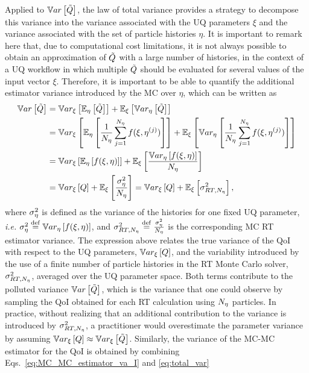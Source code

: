 Applied to $\mathbb{V}ar\left[ \tilde{Q} \right]$, the law of total variance provides a strategy to decompose this variance into the variance associated with the UQ parameters $\xi$ and the variance associated with the set of particle histories $\eta$. It is important to remark here that, due to computational cost limitations, it is not always possible to obtain an approximation of $\tilde{Q}$ with a large number of histories, in the context of a UQ workflow in which multiple $\tilde{Q}$ should be evaluated for several values of the input vector $\xi$. Therefore, it is important to be able to quantify the additional estimator variance introduced by the MC over $\eta$, which can be written as
\begin{equation}
 \label{eq:total_var}
 \begin{split}
 \mathbb{V}ar\left[ \tilde{Q} \right]  &= \mathbb{V}ar_{\xi}\left[ \mathbb{E}_\eta\left[\tilde{Q}\right] \right] + \mathbb{E}_\xi\left[ \mathbb{V}ar_{\eta}\left[\tilde{Q}\right] \right] \\
                 &= \mathbb{V}ar_{\xi}\left[ \mathbb{E}_\eta\left[ \frac{1}{N_\eta} \sum_{j=1}^{N_\eta} f( \xi, \eta^{(j)} ) \right] \right] + \mathbb{E}_\xi\left[ \mathbb{V}ar_{\eta}\left[ \frac{1}{N_\eta} \sum_{j=1}^{N_\eta} f( \xi, \eta^{(j)} ) \right] \right] \\
                 &= \mathbb{V}ar_{\xi}\left[ \mathbb{E}_\eta\left[ f( \xi, \eta ) \right] \right] + \mathbb{E}_\xi\left[ \frac{ \mathbb{V}ar_{\eta}\left[f( \xi, \eta )\right] }{ N_\eta } \right] \\
                 &= \mathbb{V}ar_{\xi}\left[ Q \right] +  \mathbb{E}_\xi\left[ \frac{ \sigma^2_\eta }{N_\eta}\right] = \mathbb{V}ar_{\xi}\left[ Q \right] +  \mathbb{E}_\xi\left[ \sigma^2_{RT,N_\eta} \right],
 \end{split}
\end{equation}
where $\sigma^2_\eta$ is defined as the variance of the histories for one fixed UQ parameter, \textit{i.e.} $\sigma^2_\eta \overset{\operatorname{def}}{=} \mathbb{V}ar_{\eta}\left[f( \xi, \eta )\right]$, and $\sigma^2_{RT,N_\eta} \overset{\operatorname{def}}{=} \frac{ \sigma^2_\eta }{N_\eta}$ is the corresponding MC RT estimator variance. The expression above relates the true variance of the QoI with respect to the UQ parameters, $\mathbb{V}ar_{\xi}\left[Q\right]$, and the variability introduced by the use of a finite number of particle histories in the RT Monte Carlo solver, $\sigma^2_{RT,N_\eta}$, averaged over the UQ parameter space. Both terms contribute to the polluted variance $\mathbb{V}ar\left[\tilde{Q}\right]$, which is the variance that one could observe by sampling the QoI obtained for each RT calculation using $N_\eta$ particles. In practice, without realizing that an additional contribution to the variance is introduced by $\sigma^2_{RT,N_\eta}$, a practitioner would overestimate the parameter variance by assuming $\mathbb{V}ar_{\xi}\left[Q\right] \approx \mathbb{V}ar_{\xi}\left[\tilde{Q}\right]$. Similarly, the variance of the MC-MC estimator for the QoI is obtained by combining Eqs.~\eqref{eq:MC_MC_estimator_va_I} and \eqref{eq:total_var}
